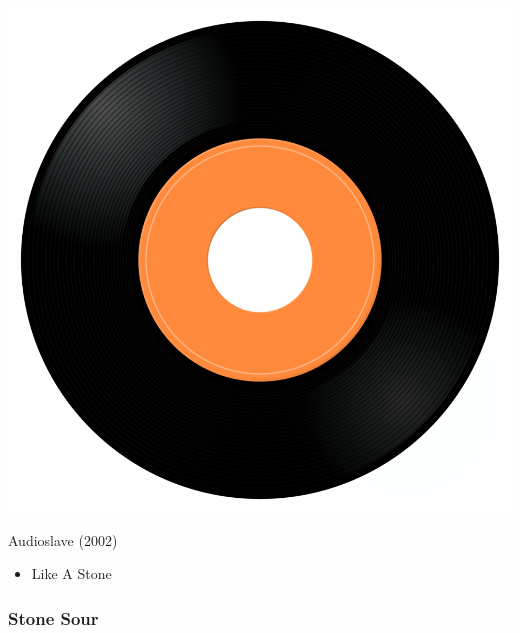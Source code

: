 \begin{minipage}[t]{0.25\textwidth}
\captionsetup{type=figure}
\includegraphics[width=\textwidth]{Images/cover.png}
\caption*{Audioslave (2002)}
\end{minipage}
\begin{minipage}[t]{0.25\textwidth}\vspace{0pt}
\begin{itemize}[nosep,leftmargin=1em,labelwidth=*,align=left]
	\setlength{\itemsep}{0pt}
	\item Like A Stone
\end{itemize}
\end{minipage}

\subsubsection{Stone Sour}

